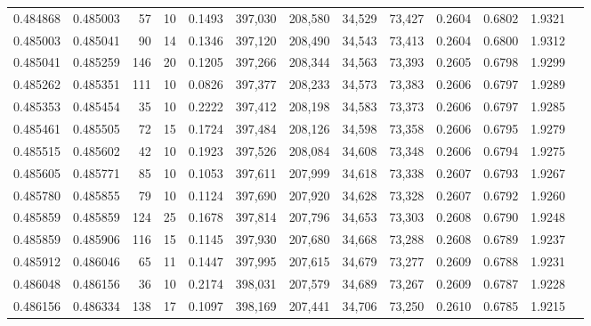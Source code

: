 \begin{tabular}{rrrrrrrrrrrrr}
0.484868 & 0.485003 &    57 &  10 &                                     0.1493 & 397,030 & 208,580 &  34,529 &  73,427 & 0.2604 & 0.6802 & 1.9321 \\
0.485003 & 0.485041 &    90 &  14 &                                     0.1346 & 397,120 & 208,490 &  34,543 &  73,413 & 0.2604 & 0.6800 & 1.9312 \\
0.485041 & 0.485259 &   146 &  20 &                                     0.1205 & 397,266 & 208,344 &  34,563 &  73,393 & 0.2605 & 0.6798 & 1.9299 \\
0.485262 & 0.485351 &   111 &  10 &                                     0.0826 & 397,377 & 208,233 &  34,573 &  73,383 & 0.2606 & 0.6797 & 1.9289 \\
0.485353 & 0.485454 &    35 &  10 &                                     0.2222 & 397,412 & 208,198 &  34,583 &  73,373 & 0.2606 & 0.6797 & 1.9285 \\
0.485461 & 0.485505 &    72 &  15 &                                     0.1724 & 397,484 & 208,126 &  34,598 &  73,358 & 0.2606 & 0.6795 & 1.9279 \\
0.485515 & 0.485602 &    42 &  10 &                                     0.1923 & 397,526 & 208,084 &  34,608 &  73,348 & 0.2606 & 0.6794 & 1.9275 \\
0.485605 & 0.485771 &    85 &  10 &                                     0.1053 & 397,611 & 207,999 &  34,618 &  73,338 & 0.2607 & 0.6793 & 1.9267 \\
0.485780 & 0.485855 &    79 &  10 &                                     0.1124 & 397,690 & 207,920 &  34,628 &  73,328 & 0.2607 & 0.6792 & 1.9260 \\
0.485859 & 0.485859 &   124 &  25 &                                     0.1678 & 397,814 & 207,796 &  34,653 &  73,303 & 0.2608 & 0.6790 & 1.9248 \\
0.485859 & 0.485906 &   116 &  15 &                                     0.1145 & 397,930 & 207,680 &  34,668 &  73,288 & 0.2608 & 0.6789 & 1.9237 \\
0.485912 & 0.486046 &    65 &  11 &                                     0.1447 & 397,995 & 207,615 &  34,679 &  73,277 & 0.2609 & 0.6788 & 1.9231 \\
0.486048 & 0.486156 &    36 &  10 &                                     0.2174 & 398,031 & 207,579 &  34,689 &  73,267 & 0.2609 & 0.6787 & 1.9228 \\
0.486156 & 0.486334 &   138 &  17 &                                     0.1097 & 398,169 & 207,441 &  34,706 &  73,250 & 0.2610 & 0.6785 & 1.9215 \\

\end{tabular}
